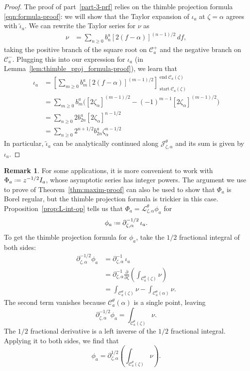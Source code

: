 \documentclass{article}
\newcommand{\series}[1]{\tilde{#1}}
\newcommand{\fracderiv}[3]{\partial^{#1}_{#2, #3}}
\newcommand*{\defeq}{\mathrel{\vcenter{\baselineskip0.5ex \lineskiplimit0pt
                     \hbox{\scriptsize.}\hbox{\scriptsize.}}}%
                     =}
\newcommand{\laplace}{\mathcal{L}}
\theoremstyle{definition}
\newtheorem{remark}[definition]{Remark}
\theoremstyle{plain}
\begin{document}
\begin{proof}
The proof of part~\ref{part-3-prf} relies on the thimble projection formula \eqref{eqn:formula-proof}: we will show that the Taylor expansion of $\iota_a$ at $\zeta=\alpha$ agrees with $\series{\iota}_a$. We can rewrite the Taylor series for $\nu$ as
\begin{align*}
\nu & = \sum_{n \ge 0} b_n^a [2(f - \alpha)]^{(n - 1)/2}\,df,
\end{align*}
taking the positive branch of the square root on $\mathcal{C}^+_a$ and the negative branch on $\mathcal{C}^-_a$. Plugging this into our expression for $\iota_a$ (in Lemma~\ref{lem:thimble_proj_formula-proof}), we learn that
\begin{align*}
\iota_a & = \left[ \sum_{m \ge 0} b_m^a [2(f - \alpha)]^{(m - 1)/2} \right]_{\operatorname{start} \mathcal{C}_a(\zeta)}^{\operatorname{end} \mathcal{C}_a(\zeta)} \\
& = \sum_{m \ge 0} b_m^a \Big( [2\zeta_\alpha]^{(m - 1)/2} - (-1)^{m-1}[2\zeta_\alpha]^{(m - 1)/2} \Big) \\
& = \sum_{n \ge 0} 2 b_{2n}^a [2\zeta_\alpha]^{n - 1/2} \\
& = \sum_{n \ge 0} 2^{n+1/2} b_{2n}^a \zeta_\alpha^{n - 1/2}
\end{align*}
In particular, $\series{\iota}_a$ can be analytically continued along $\mathcal{J}_{\zeta,\alpha}^\theta$ and its sum is given by $\iota_a$.
\end{proof}
\begin{remark}\label{rmk:1/2-deriv}
For some applications, it is more convenient to work with $\Phi_a \defeq z^{-1/2} I_a$, whose asymptotic series has integer powers. The argument we use to prove of Theorem~\ref{thm:maxim-proof} can also be used to show that $\Phi_a$ is Borel regular, but the thimble projection formula is trickier in this case. Proposition~\ref{prop:L-int-op} tells us that $\Phi_a = \laplace^\theta_{\zeta, \alpha} \phi_a$ for
\[\phi_a \defeq \fracderiv{-1/2}{\zeta}{\alpha}\,\iota_a. \]
To get the thimble projection formula for $\phi_a$, take the $1/2$ fractional integral of both sides:
\begin{align*}
\fracderiv{-1/2}{\zeta}{\alpha} \phi_a & = \fracderiv{-1}{\zeta}{\alpha} \, \iota_a \\
& = \fracderiv{-1}{\zeta}{\alpha} \frac{\partial}{\partial \zeta} \left( \int_{\mathcal{C}_a^\theta(\zeta)}\nu \right) \\
& = \int_{\mathcal{C}_a^\theta(\zeta)}\nu - \int_{\mathcal{C}_a^\theta(\alpha)}\nu.
\end{align*}
The second term vanishes because $\mathcal{C}_a^\theta(\alpha)$ is a single point, leaving
\[ \fracderiv{-1/2}{\zeta}{\alpha} \phi_a = \int_{\mathcal{C}_a^\theta(\zeta)}\nu. \]
The $1/2$ fractional derivative is a left inverse of the $1/2$ fractional integral. Applying it to both sides, we find that
\begin{equation}\label{eqn:formula--1/2} \phi_a = \fracderiv{1/2}{\zeta}{\alpha} \left( \int_{\mathcal{C}_a^\theta(\zeta)}\nu \right).\end{equation}
\end{remark}
\end{document}

